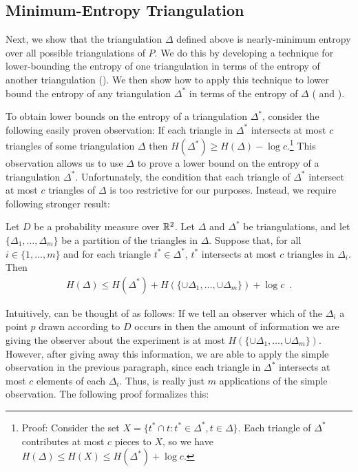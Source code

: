 \documentclass[lotsofwhite]{patmorin}
\begin{document}
\subsection{Minimum-Entropy Triangulation}

Next, we show that the triangulation $\Delta$ defined above is
nearly-minimum entropy over all possible triangulations of $P$.  We do
this by developing a technique for lower-bounding the entropy of one
triangulation in terms of the entropy of another triangulation
().  We then show how to apply this technique to lower
bound the entropy of any triangulation $\Delta^*$ in terms of the
entropy of $\Delta$ ( and ).
  
To obtain lower bounds on the entropy of a triangulation $\Delta^*$,
consider the following easily proven observation: If each triangle in
$\Delta^*$ intersects at most $c$ triangles of some triangulation
$\Delta$ then $H(\Delta^*) \ge H(\Delta) - \log c$.\footnote{Proof:
Consider the set $X=\{ t^*\cap t : t^*\in\Delta^*, t\in \Delta\}$.
Each triangle of $\Delta^*$ contributes at most $c$ pieces to $X$, so
we have $H(\Delta) \le H(X) \le H(\Delta^*) + \log c$.}  This
observation allows us to use $\Delta$ to prove a lower bound on the
entropy of a triangulation $\Delta^*$.  Unfortunately, the condition
that each triangle of $\Delta^*$ intersect at most $c$ triangles of
$\Delta$ is too restrictive for our purposes.  Instead, we require
following stronger result:

\begin{lem}
Let $D$ be a probability measure over $\mathbb{R}^2$.  Let $\Delta$ and
$\Delta^*$ be triangulations, and let $\{\Delta_1,\ldots,\Delta_m\}$
be a partition of the triangles in $\Delta$.  Suppose that, for all
$i\in\{1,\ldots,m\}$ and for each triangle $t^*\in\Delta^*$, $t^*$
intersects at most $c$ triangles in $\Delta_i$.  Then
\begin{eqnarray*}
   H(\Delta) \le 
	 H(\Delta^*) + H(\{\cup\Delta_1,\ldots,\cup\Delta_m\}) + \log c
 \enspace . 
\end{eqnarray*}
\end{lem}

Intuitively,  can be thought of as follows:  If we tell
an observer which of the $\Delta_i$ a point $p$ drawn according to $D$
occurs in then the amount of information we are giving the observer
about the experiment is at most
$H(\{\cup\Delta_1,\ldots,\cup\Delta_m\})$.  However, after giving away
this information, we are able to apply the simple observation in the
previous paragraph, since each triangle in $\Delta^*$ intersects at
most $c$ elements of each $\Delta_i$.  Thus,  is really
just $m$ applications of the simple observation.  The following proof
formalizes this:
\end{document}
